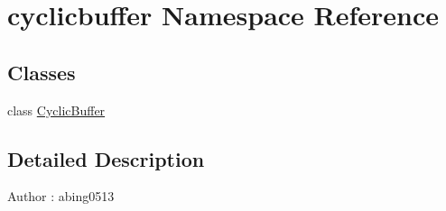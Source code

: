 \hypertarget{namespacecyclicbuffer}{\section{cyclicbuffer \-Namespace \-Reference}
\label{namespacecyclicbuffer}
}
\subsection*{\-Classes}
\begin{DoxyCompactItemize}
\item 
class \hyperlink{classcyclicbuffer_1_1CyclicBuffer}{\-Cyclic\-Buffer}
\end{DoxyCompactItemize}


\subsection{\-Detailed \-Description}
\-Author \-: abing0513 